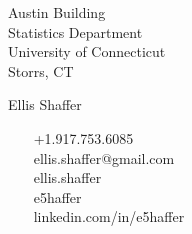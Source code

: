 \documentclass{article}
\begin{document}

\begin{multicols}{3}
	 Austin Building\\
	Statistics Department\\
	University of Connecticut\\
	Storrs, CT
	
	\columnbreak
	\noindent
	\begin{center}
	\begin{huge}
	Ellis Shaffer
	\end{huge}
	\end{center}
	
	\columnbreak
	~~ \ +1.917.753.6085\\
	\indent
	~~ \ ellis.shaffer@gmail.com\\
	\indent
	~~ \ ellis.shaffer\\
	\indent
	~~ \ e5haffer\\
	\indent
	~~ \ linkedin.com/in/e5haffer

\end{multicols}
\end{document}
